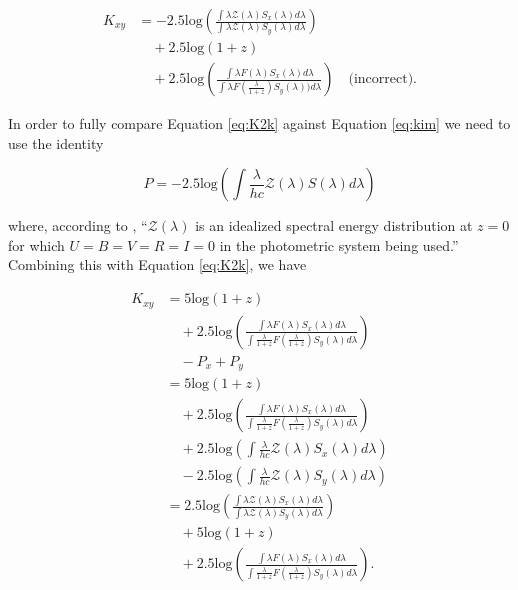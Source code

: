 \begin{equation}
\begin{aligned}
\label{eq:kim}
  K_{xy} &=
    -2.5\text{log} \left(
      \frac{\int \lambda \mathcal{Z}(\lambda)S_x(\lambda)d\lambda}
           {\int \lambda \mathcal{Z}(\lambda)S_y(\lambda)d\lambda}\right) \\
    &\quad + 2.5\text{log}(1+z) \\
    &\quad + 2.5\text{log}\left(
      \frac{\int \lambda F(\lambda)S_x(\lambda)d\lambda}
           {\int \lambda F\left(\frac{\lambda}{1+z}\right)S_y(\lambda))d\lambda}\right) \quad \text{(incorrect)}.
\end{aligned}
\end{equation}

In order to fully compare Equation \ref{eq:K2k} against Equation \ref{eq:kim} we need to use the identity

\begin{equation}
  P = -2.5 \text{log} \left( \int \frac{\lambda}{hc} \mathcal{Z}(\lambda) S(\lambda) d\lambda \right)
\end{equation}

\noindent where, according to \citet{kim1996}, ``$\mathcal{Z}(\lambda)$ is an
idealized spectral energy distribution at $z = 0$ for which
$U = B = V = R = I = 0$ in the photometric system being used.'' Combining this
with Equation \ref{eq:K2k}, we have

\begin{equation}
\begin{aligned}
  K_{xy} &= 5 \text{log} (1 + z) \\
         &\quad + 2.5 \text{log} \left(
              \frac{\int \lambda F(\lambda) S_x(\lambda) d\lambda}
                   {\int \frac{\lambda}{1+z} F\left(\frac{\lambda}{1+z}\right) S_y(\lambda) d\lambda} \right) \\
         &\quad - P_x + P_y \\
         &= 5 \text{log} (1 + z) \\
         &\quad + 2.5 \text{log} \left(
              \frac{\int \lambda F(\lambda) S_x(\lambda) d\lambda}
                   {\int \frac{\lambda}{1+z} F\left(\frac{\lambda}{1+z}\right) S_y(\lambda) d\lambda} \right) \\
         &\quad + 2.5 \text{log} \left( \int \frac{\lambda}{hc} \mathcal{Z}(\lambda) S_x(\lambda) d\lambda \right) \\
         &\quad - 2.5 \text{log} \left( \int \frac{\lambda}{hc} \mathcal{Z}(\lambda) S_y(\lambda) d\lambda \right) \\
         &= 2.5 \text{log} \left(
              \frac{\int \lambda \mathcal{Z}(\lambda) S_x(\lambda) d\lambda}
                   {\int \lambda \mathcal{Z}(\lambda) S_y(\lambda) d\lambda}
             \right) \\
         &\quad + 5 \text{log} (1 + z) \\
         &\quad + 2.5 \text{log} \left(
              \frac{\int \lambda F(\lambda) S_x(\lambda) d\lambda}
                   {\int \frac{\lambda}{1+z} F\left(\frac{\lambda}{1+z}\right) S_y(\lambda) d\lambda} \right) .
\end{aligned}
\end{equation}

